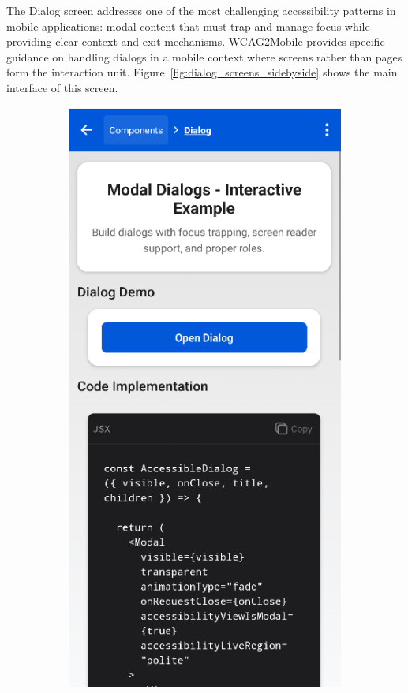 The Dialog screen addresses one of the most challenging accessibility patterns in mobile applications: modal content that must trap and manage focus while providing clear context and exit mechanisms. WCAG2Mobile provides specific guidance on handling dialogs in a mobile context where screens rather than pages form the interaction unit. Figure~\ref{fig:dialog_screens_sidebyside} shows the main interface of this screen.

\begin{figure}[ht]
    \centering
    \begin{subfigure}[b]{0.48\textwidth}
        \centering
        \includegraphics[width=\linewidth, alt={First part of the Dialog screen}]{img/dialog1.png}

\end{subfigure}
\end{figure}
